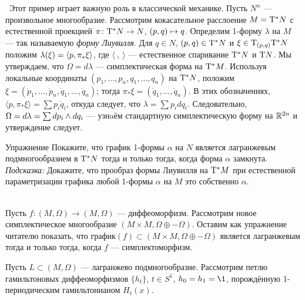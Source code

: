 \begin{ex}{}\label{3.1.C}\ 
Этот пример играет важную роль в классической механике.
Пусть $N^n$ — произвольное многообразие.
Рассмотрим кокасательное расслоение $M \z= \T^\ast N$ с естественной
проекцией $\pi\colon \mathrm{T}^\ast N \to N$, $(p, q) \z\mapsto q$.
Определим 1-форму $\lambda$ на $M$ — так называемую \emph{форму Лиувилля}.
Для $q \in N$, $(p, q) \in \mathrm{T}^\ast N$ и $\xi \in \mathrm{T}_{(p, q)} \mathrm{T}^\ast
N$ положим $\lambda (\xi) \z= \langle p, \pi_\ast \xi \rangle$, где
$\langle\ ,\ \rangle$ — естественное спаривание $\mathrm{T}^\ast N$ и $\mathrm{T} N$. 
Мы утверждаем, что $\Omega = d\lambda$ — симплектическая форма на $\mathrm{T}^\ast M$.
Используя локальные координаты $(p_1,\dots, p_n, q_1,\dots, q_n)$ на
$\mathrm{T}^\ast N$, положим $\xi = (\dot p_1 ,\dots, \dot p_n, \dot
q_1,\dots,\dot q_n)$; 
тогда $\pi_\ast \xi = (\dot q_1,\dots, \dot q_n)$.
В этих обозначениях, $\langle p, \pi_\ast \xi\rangle=\sum p_i \dot
q_i$, откуда следует, что $\lambda=\sum p_i dq_i$.
Следовательно, $\Omega = d\lambda =\sum dp_i \z\wedge dq_i$ — узнaём
стандартную симплектическую форму на $\mathbb{R}^{2n}$ и утверждение
следует. 
\end{ex}


\begin{ex*}{Упражнение}\label{1-form-lagrange}
Покажите, что график 1-формы $\alpha$ на $N$ является лагранжевым
подмногообразием в $\mathrm{T}^\ast N$ тогда и только тогда, когда форма
$\alpha$ замкнута. 
\noindent\textit{Подсказка:} Докажите, что прообраз формы Лиувилля на
$\mathrm{T}^\ast M$ при естественной параметризации графика любой 1-формы
$\alpha$ на $M$ это собственно $\alpha$.
\end{ex*}


\begin{ex}{}\label{3.1.D}\\ 
Пусть $f\colon (M, \Omega) \to (M, \Omega)$ — диффеоморфизм.
Рассмотрим новое симплектическое многообразие $(M \times M, \Omega \oplus -\Omega)$.
Оставим как упражнение читателю показать, что график$(f) \subset (M \times M, \Omega \oplus -\Omega)$ является лагранжевым тогда и только тогда, когда $f$ — симплектоморфизм.
\end{ex}

\begin{ex}[Лагранжева надстройка.]{}\label{3.1.E}
Пусть $L\subset(M,\Omega)$ — лагранжево подмногообразие.
Рассмотрим петлю гамильтоновых диффеоморфизмов $\{h_t\}$, $t\in S^1$,
$h_0=h_1=\1$, порождённую 1-периодическим гамильтонианом
$H_{t}(x)$. 
\end{ex}

